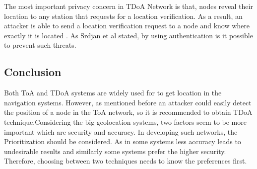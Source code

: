 The most important privacy concern in TDoA Network is that, nodes reveal their location to any station that requests for a location verification. As a result, an attacker is able to send a location verification request to a node and know where exactly it is located \cite{srivastava}. As Srdjan et al stated, by using authentication is it possible to prevent such threats.

\subsection{Conclusion}
Both ToA and TDoA systems are widely used for to get location in the navigation systems. However, as mentioned before an attacker could easily detect the position of a node in the ToA network, so it is recommended to obtain TDoA technique.Considering the big geolocation systems, two factors seem to be more important which are security and accuracy. In developing such networks, the Prioritization should be considered. As in some systems less accuracy leads to undesirable results and similarly some systems prefer the higher security. Therefore, choosing between two techniques needs to know the preferences first.